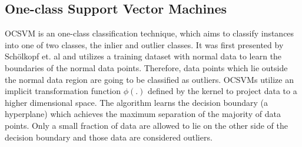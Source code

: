 \documentclass{mpaper}
\begin{document}
\subsection{One-class Support Vector Machines}
OCSVM is an one-class classification technique, which aims to classify instances into one of two classes, the inlier and outlier classes. It was first presented by Schölkopf et. al \cite{OriginalOCSVM} and utilizes a training dataset with normal data to learn the boundaries of the normal data points. Therefore, data points which lie outside the normal data region are going to be classified as outliers. OCSVMs utilize an implicit transformation function $\phi\left(.\right)$ defined by the kernel to project data to a higher dimensional space. The algorithm learns the decision boundary (a hyperplane) which achieves the maximum separation of the majority of data points. %
Only a small fraction of data are allowed to lie on the other side of the decision boundary and those data are considered outliers. 
\end{document}
